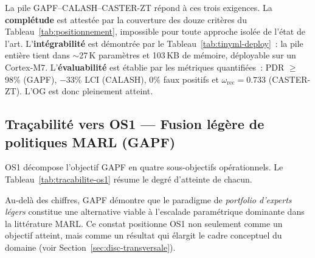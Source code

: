 La pile GAPF--CALASH--CASTER-ZT répond à ces trois exigences. La \textbf{complétude} est attestée par la couverture des douze critères du Tableau~\ref{tab:positionnement}, impossible pour toute approche isolée de l'état de l'art. L'\textbf{intégrabilité} est démontrée par le Tableau~\ref{tab:tinyml-deploy}~: la pile entière tient dans $\sim$27\,K paramètres et 103\,KB de mémoire, déployable sur un Cortex-M7. L'\textbf{évaluabilité} est établie par les métriques quantifiées~: PDR $\geq$ 98\% (GAPF), $-33\%$ LCI (CALASH), 0\% faux positifs et $\omega_{\text{rec}} = 0.733$ (CASTER-ZT). L'OG est donc pleinement atteint.

\subsection{Traçabilité vers OS1 --- Fusion légère de politiques MARL (GAPF)}

OS1 décompose l'objectif GAPF en quatre sous-objectifs opérationnels. Le Tableau~\ref{tab:tracabilite-os1} résume le degré d'atteinte de chacun.

\begin{table}[htbp]
\centering
\caption{Traçabilité des résultats GAPF vers les sous-objectifs OS1.}
\label{tab:tracabilite-os1}
\end{table}

Au-delà des chiffres, GAPF démontre que le paradigme de \emph{portfolio d'experts légers} constitue une alternative viable à l'escalade paramétrique dominante dans la littérature MARL. Ce constat positionne OS1 non seulement comme un objectif atteint, mais comme un résultat qui élargit le cadre conceptuel du domaine (voir Section~\ref{sec:disc-transversale}).

